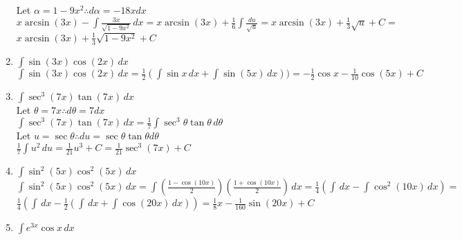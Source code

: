 \documentclass[10pt, letterpaper]{report}
\begin{document}
\begin{enumerate}
    Let $\alpha=1-9x^{2}\therefore d\alpha=-18xdx$ \\
    
    $x\arcsin{(3x)}-\int{\frac{3x}{\sqrt{1-9x^{2}}}\,dx}=
    x\arcsin{(3x)}+\frac{1}{6}\int{\frac{du}{\sqrt{u}}}=
    x\arcsin{(3x)}+\frac{1}{3}\sqrt{u}+C=$ \\
    
    $x\arcsin{(3x)}+\frac{1}{3}\sqrt{1-9x^{2}}+C$ \\
    
  \item{$\int{\sin{(3x)}\cos{(2x)}}\,dx$} \\ 
  
    $\int{\sin{(3x)}\cos{(2x)}}\,dx=
    \frac{1}{2}\left(\int{\sin{x}}\,dx+\int{\sin{(5x)}}\,dx\right))=
    -\frac{1}{2}\cos{x}-\frac{1}{10}\cos{(5x)}+C$ \\
    
  \item{$\int{\sec^{3}{(7x)}\tan{(7x)}}\,dx$} \\
  
    Let $\theta=7x\therefore d\theta=7dx$ \\
    
    $\int{\sec^{3}{(7x)}\tan{(7x)}}\,dx=
    \frac{1}{7}\int{\sec^{3}{\theta}\tan{\theta}}\,d\theta$ \\
    
    Let $u=\sec{\theta}\therefore du=\sec{\theta}\tan{\theta}d\theta$ \\
    
    $\frac{1}{7}\int{u^{2}}\,du=
    \frac{1}{21}u^{3}+C=
    \frac{1}{21}\sec^{3}{(7x)}+C$ \\
    
  \item{$\int{\sin^{2}{(5x)}\cos^{2}{(5x)}}\,dx$} \\
  
    $\int{\sin^{2}{(5x)}\cos^{2}{(5x)}}\,dx=
    \int{\left(\frac{1-\cos{(10x)}}{2}\right)\left(\frac{1+\cos{(10x)}}{2}\right)}\,dx=
    \frac{1}{4}\left(\int{}\,dx-\int{\cos^{2}{(10x)}}\,dx\right)= $ \\
    
    $\frac{1}{4}\left(\int{}\,dx-\frac{1}{2}\left(\int{}\,dx+\int{\cos{(20x)}}\,dx\right)\right)=
    \frac{1}{8}x-\frac{1}{160}\sin{(20x)}+C$ \\
    
  \item{$\int{e^{3x}\cos{x}}\,dx$} \\
    

\end{enumerate}
\end{document}
